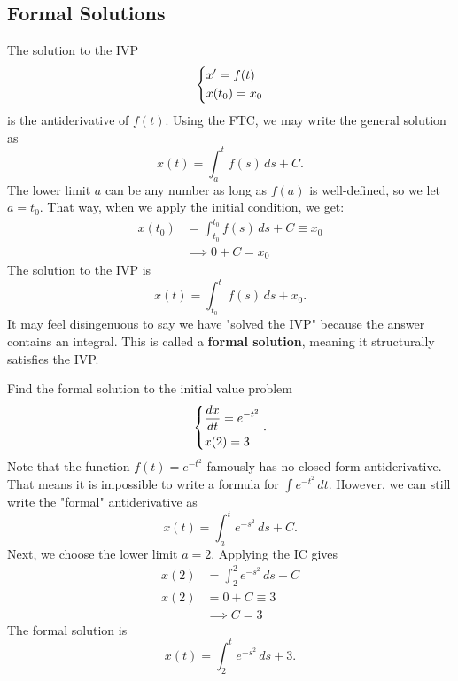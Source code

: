 \documentclass[letterpaper]{article}
\begin{document}
\subsection{Formal Solutions}

The solution to the IVP
\[
\begin{dcases}
    x' = f(t)\\
    x(t_0)=x_0
\end{dcases}
\]
is the antiderivative of $f(t)$. Using the FTC, we may write the general solution as
\[
x(t) = \int_a^t f(s)\,ds+C. 
\]
The lower limit $a$ can be any number as long as $f(a)$ is well-defined, so we let $a=t_0$. That way, when we apply the initial condition, we get:
\begin{align*}
    x(t_0)&=\int_{t_0}^{t_0} f(s)\,ds +C\equiv x_0\\
          &\implies0 +C = x_0
\end{align*}
The solution to the IVP is
\[
    x(t) =  \int_{t_0}^t f(s)\,ds+x_0. 
\]
It may feel disingenuous to say we have "solved the IVP" because the answer contains an integral. This is called a \textbf{formal solution}, meaning it structurally satisfies the IVP. 


\begin{example}[5]{
Find the formal solution to the initial value problem
\[
\begin{dcases}
    \frac{dx}{dt}= e^{-t^2}\\
    x(2) = 3
\end{dcases}.
\]
}
Note that the function $f(t) = e^{-t^2}$ famously has no closed-form antiderivative. That means it is impossible to write a formula for $\int e^{-t^2}\,dt$. However, we can still write the "formal" antiderivative as 
\[
    x(t) = \int_a^t e^{-s^2}\,ds +C.
\]
Next, we choose the lower limit $a=2$. Applying the IC gives 
\begin{align*}
    x(2) &= \int_2^2 e^{-s^2}\,ds +C\\
    x(2) &= 0 +C  \equiv 3\\
    &\implies C = 3
\end{align*}
The formal solution is 
\[
\boxed{
 x(t)= \int_2^t e^{-s^2}\,ds+3. 
}
\]
\end{example}

\end{document}

